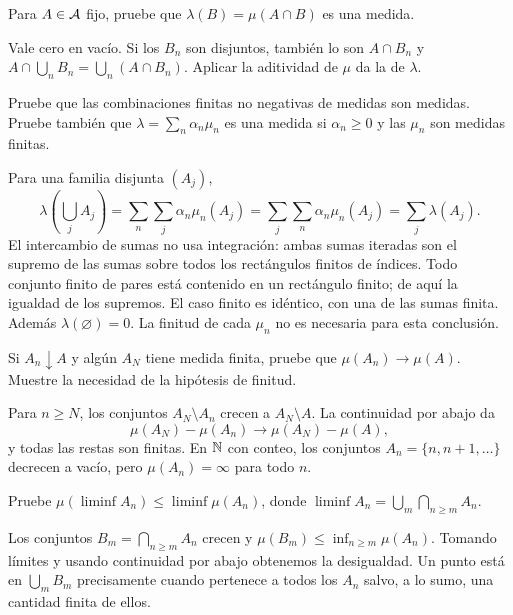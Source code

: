 \begin{ejercicio}\label{ej:v2-l02-1}
Para $A\in\mathcal A$ fijo, pruebe que $\lambda(B)=\mu(A\cap B)$ es una medida.
\end{ejercicio}
\begin{solucion}
Vale cero en vacío. Si los $B_n$ son disjuntos, también lo son $A\cap B_n$ y $A\cap\bigcup_nB_n=\bigcup_n(A\cap B_n)$. Aplicar la aditividad de $\mu$ da la de $\lambda$.
\end{solucion}

\begin{ejercicio}\label{ej:v2-l02-2}
Pruebe que las combinaciones finitas no negativas de medidas son medidas. Pruebe también que $\lambda=\sum_n\alpha_n\mu_n$ es una medida si $\alpha_n\ge0$ y las $\mu_n$ son medidas finitas.
\end{ejercicio}
\begin{solucion}
Para una familia disjunta $(A_j)$,
\[\lambda\left(\bigcup_jA_j\right)=\sum_n\sum_j\alpha_n\mu_n(A_j)=\sum_j\sum_n\alpha_n\mu_n(A_j)=\sum_j\lambda(A_j).\]
El intercambio de sumas no usa integración: ambas sumas iteradas son el supremo de las sumas sobre todos los rectángulos finitos de índices. Todo conjunto finito de pares está contenido en un rectángulo finito; de aquí la igualdad de los supremos. El caso finito es idéntico, con una de las sumas finita. Además $\lambda(\varnothing)=0$. La finitud de cada $\mu_n$ no es necesaria para esta conclusión.
\end{solucion}

\begin{ejercicio}\label{ej:v2-l02-3}
Si $A_n\downarrow A$ y algún $A_N$ tiene medida finita, pruebe que $\mu(A_n)\to\mu(A)$. Muestre la necesidad de la hipótesis de finitud.
\end{ejercicio}
\begin{solucion}
Para $n\ge N$, los conjuntos $A_N\setminus A_n$ crecen a $A_N\setminus A$. La continuidad por abajo da
\[\mu(A_N)-\mu(A_n)\longrightarrow\mu(A_N)-\mu(A),\]
y todas las restas son finitas. En $\mathbb N$ con conteo, los conjuntos $A_n=\{n,n+1,\ldots\}$ decrecen a vacío, pero $\mu(A_n)=\infty$ para todo $n$.
\end{solucion}

\begin{ejercicio}\label{ej:v2-l02-4}
Pruebe $\mu(\liminf A_n)\le\liminf\mu(A_n)$, donde $\liminf A_n=\bigcup_m\bigcap_{n\ge m}A_n$.
\end{ejercicio}
\begin{solucion}
Los conjuntos $B_m=\bigcap_{n\ge m}A_n$ crecen y $\mu(B_m)\le\inf_{n\ge m}\mu(A_n)$. Tomando límites y usando continuidad por abajo obtenemos la desigualdad. Un punto está en $\bigcup_mB_m$ precisamente cuando pertenece a todos los $A_n$ salvo, a lo sumo, una cantidad finita de ellos.
\end{solucion}

